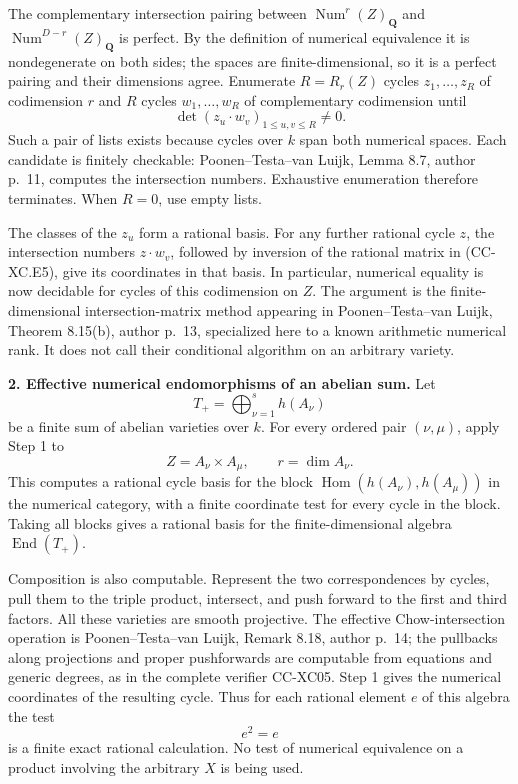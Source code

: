 The complementary intersection pairing between
\(\operatorname{Num}^r(Z)_{\mathbf Q}\) and
\(\operatorname{Num}^{D-r}(Z)_{\mathbf Q}\) is perfect. By the
definition of numerical equivalence it is nondegenerate on both sides;
the spaces are finite-dimensional, so it is a perfect pairing and their
dimensions agree. Enumerate \(R=R_r(Z)\) cycles \(z_1,\ldots,z_R\) of
codimension \(r\) and \(R\) cycles \(w_1,\ldots,w_R\) of complementary
codimension until \[
             \det(z_u\cdot w_v)_{1\le u,v\le R}\ne0.
                                                        \tag{CC-XC.E5}
\] Such a pair of lists exists because cycles over \(k\) span both
numerical spaces. Each candidate is finitely checkable:
Poonen--Testa--van Luijk, Lemma 8.7, author p.~11, computes the
intersection numbers. Exhaustive enumeration therefore terminates. When
\(R=0\), use empty lists.

The classes of the \(z_u\) form a rational basis. For any further
rational cycle \(z\), the intersection numbers \(z\cdot w_v\), followed
by inversion of the rational matrix in (CC-XC.E5), give its coordinates
in that basis. In particular, numerical equality is now decidable for
cycles of this codimension on \(Z\). The argument is the
finite-dimensional intersection-matrix method appearing in
Poonen--Testa--van Luijk, Theorem 8.15(b), author p.~13, specialized
here to a known arithmetic numerical rank. It does not call their
conditional algorithm on an arbitrary variety.

\textbf{2. Effective numerical endomorphisms of an abelian sum.} Let \[
                   T_+=\bigoplus_{\nu=1}^{s}h(A_\nu)
                                                        \tag{CC-XC.E6}
\] be a finite sum of abelian varieties over \(k\). For every ordered
pair \((\nu,\mu)\), apply Step 1 to \[
 Z=A_\nu\times A_\mu,\qquad r=\dim A_\nu.
 \] This computes a rational cycle basis for the block
\(\operatorname{Hom}(h(A_\nu),h(A_\mu))\) in the numerical category,
with a finite coordinate test for every cycle in the block. Taking all
blocks gives a rational basis for the finite-dimensional algebra
\(\operatorname{End}(T_+)\).

Composition is also computable. Represent the two correspondences by
cycles, pull them to the triple product, intersect, and push forward to
the first and third factors. All these varieties are smooth projective.
The effective Chow-intersection operation is Poonen--Testa--van Luijk,
Remark 8.18, author p.~14; the pullbacks along projections and proper
pushforwards are computable from equations and generic degrees, as in
the complete verifier CC-XC05. Step 1 gives the numerical coordinates of
the resulting cycle. Thus for each rational element \(e\) of this
algebra the test \[
                              e^2=e                     \tag{CC-XC.E7}
\] is a finite exact rational calculation. No test of numerical
equivalence on a product involving the arbitrary \(X\) is being used.

